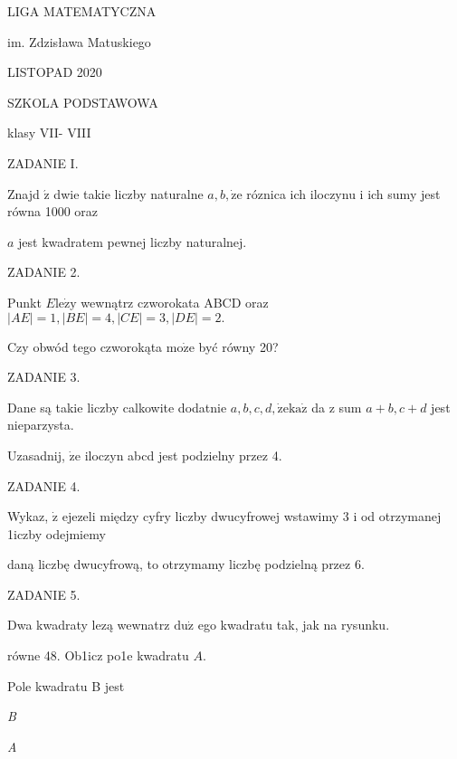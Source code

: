 \documentclass[a4paper,12pt]{article}
\begin{document}
LIGA MATEMATYCZNA

im. Zdzisława Matuskiego

LISTOPAD 2020

SZKOLA PODSTAWOWA

klasy VII- VIII

ZADANIE I.

Znajd $\acute{\mathrm{z}}$ dwie takie liczby naturalne $a, b, \dot{\mathrm{z}}\mathrm{e}$ róznica ich iloczynu i ich sumy jest równa 1000 oraz

$a$ jest kwadratem pewnej liczby naturalnej.

ZADANIE 2.

Punkt $E\mathrm{l}\mathrm{e}\dot{\mathrm{z}}\mathrm{y}$ wewnątrz czworokata ABCD oraz $|AE| = 1, |BE| =4, |CE| =3, |DE| =2.$

Czy obwód tego czworokąta $\mathrm{m}\mathrm{o}\dot{\mathrm{z}}\mathrm{e}$ być równy 20?

ZADANIE 3.

Dane są takie liczby calkowite dodatnie $a, b, c, d, \dot{\mathrm{z}}\mathrm{e}\mathrm{k}\mathrm{a}\dot{\mathrm{z}}$ da z sum $a+b, c+d$ jest nieparzysta.

Uzasadnij, $\dot{\mathrm{z}}\mathrm{e}$ iloczyn abcd jest podzielny przez 4.

ZADANIE 4.

Wykaz, $\dot{\mathrm{z}}$ ejezeli między cyfry liczby dwucyfrowej wstawimy 3 i od otrzymanej 1iczby odejmiemy

daną liczbę dwucyfrową, to otrzymamy liczbę podzielną przez 6.

ZADANIE 5.

Dwa kwadraty lezą wewnatrz $\mathrm{d}\mathrm{u}\dot{\mathrm{z}}$ ego kwadratu tak, jak na rysunku.

równe 48. Ob1icz po1e kwadratu $A.$

Pole kwadratu B jest

{\it B}

{\it A}
\end{document}
